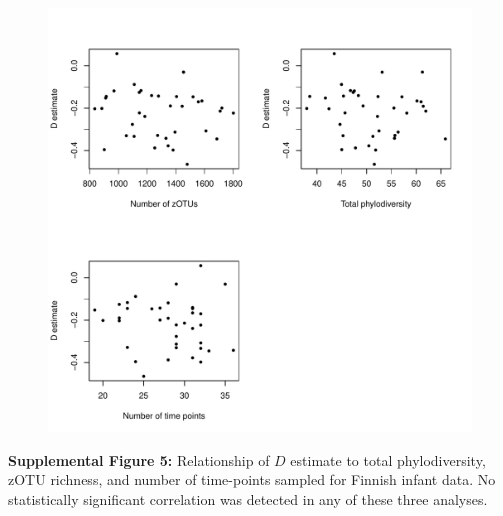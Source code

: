 \documentclass{article}
\begin{document}
{\begin{figure}[t]
	\centering
	\includegraphics[scale=0.80]{figs/Fig_S5.pdf}
\end{figure}
\textbf{Supplemental Figure 5:}\label{sec:figureS5} Relationship of \(D\) estimate to total phylodiversity, zOTU richness, and number of time-points sampled for Finnish infant data. No statistically significant correlation was detected in any of these three analyses. 

}%
\end{document}
